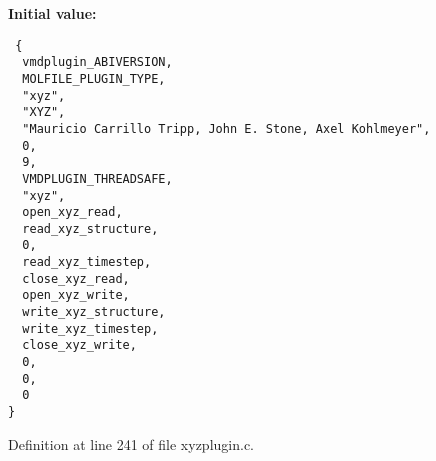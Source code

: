 {\bf Initial value:}

\footnotesize\begin{verbatim} {
  vmdplugin_ABIVERSION,
  MOLFILE_PLUGIN_TYPE,                         
  "xyz",                                       
  "XYZ",                                       
  "Mauricio Carrillo Tripp, John E. Stone, Axel Kohlmeyer",    
  0,                                           
  9,                                           
  VMDPLUGIN_THREADSAFE,                        
  "xyz",
  open_xyz_read,
  read_xyz_structure,
  0,
  read_xyz_timestep,
  close_xyz_read,
  open_xyz_write,
  write_xyz_structure,
  write_xyz_timestep,
  close_xyz_write,
  0,                            
  0,                            
  0                             
}\end{verbatim}\normalsize 


Definition at line 241 of file xyzplugin.c.